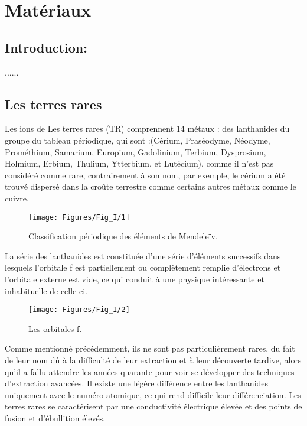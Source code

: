 \chapter{Matériaux} %

\label{Chaputer1} %

\section{Introduction:}
......
\section{Les terres rares}
Les ions de Les terres rares (TR) comprennent 14 métaux : des lanthanides du groupe  du tableau périodique, qui sont :(Cérium, Praséodyme, Néodyme, Prométhium, Samarium, Europium, Gadolinium, Terbium, Dysprosium, Holmium, Erbium, Thulium, Ytterbium, et Lutécium), comme il n'est pas considéré comme rare, contrairement à son nom, par exemple, le cérium a été trouvé dispersé dans la croûte terrestre comme certains autres métaux comme le cuivre\cite{a1}.

\begin{figure}[h!]
	\centering
	\texttt{[image: Figures/Fig\_I/1]}
	\caption{Classification périodique des éléments de Mendeleïv.}
	\label{fig:1}
\end{figure}
\FloatBarrier

La série des lanthanides est constituée d'une série d'éléments successifs dans lesquels l'orbitale f est partiellement ou complètement remplie d'électrons et l'orbitale externe est vide, ce qui conduit à une physique intéressante et inhabituelle de celle-ci.

\begin{figure}[h!]
	\centering
	\texttt{[image: Figures/Fig\_I/2]}
	\caption{Les orbitales f.}
	\label{fig:2}
\end{figure}
\FloatBarrier
Comme mentionné précédemment, ils ne sont pas particulièrement rares, du fait de leur nom dû à la difficulté de leur extraction et à leur découverte tardive, alors qu'il a fallu attendre les années quarante pour voir se développer des techniques d'extraction avancées. Il existe une légère différence entre les lanthanides uniquement avec le numéro atomique, ce qui rend difficile leur différenciation. Les terres rares se caractérisent par une conductivité électrique élevée et des points de fusion et d'ébullition élevés.

